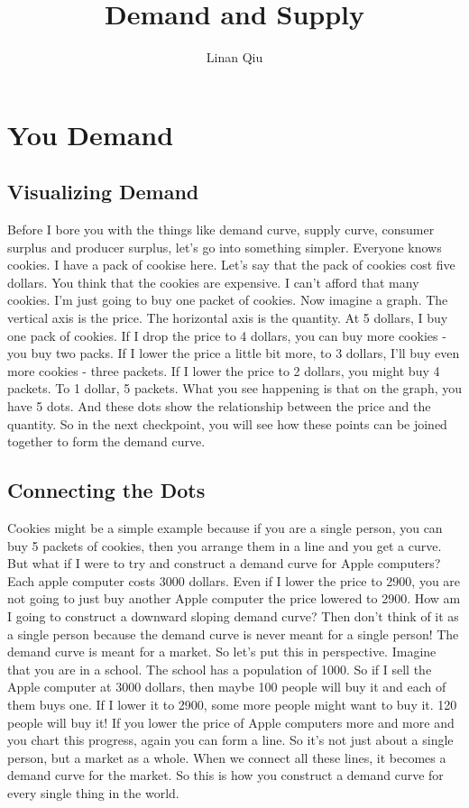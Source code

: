 \documentclass[DIV=classic,11pt,numbers=noenddot,listof=totoc,bibliography=totoc,parskip]{scrartcl}
\title{Demand and Supply}
\author{Linan Qiu}
\date{}
\begin{document}
\maketitle
\tableofcontents
\newpage
\section{You Demand}
\subsection{Visualizing Demand}
Before I bore you with the things like demand curve, supply curve, consumer surplus and producer surplus, let's go into something simpler. Everyone knows cookies. I have a pack of cookise here. Let's say that the pack of cookies cost five dollars. You think that the cookies are expensive. I can't afford that many cookies. I'm just going to buy one packet of cookies. Now imagine a graph. The vertical axis is the price. The horizontal axis is the quantity. At 5 dollars, I buy one pack of cookies. If I drop the price to 4 dollars, you can buy more cookies - you buy two packs. If I lower the price a little bit more, to 3 dollars, I'll buy even more cookies - three packets. If I lower the price to 2 dollars, you might buy 4 packets. To 1 dollar, 5 packets. What you see happening is that on the graph, you have 5 dots. And these dots show the relationship between the price and the quantity. So in the next checkpoint, you will see how these points can be joined together to form the demand curve.
\subsection{Connecting the Dots}
Cookies might be a simple example because if you are a single person, you can buy 5 packets of cookies, then you arrange them in a line and you get a curve. But what if I were to try and construct a demand curve for Apple computers? Each apple computer costs 3000 dollars. Even if I lower the price to 2900, you are not going to just buy another Apple computer the price lowered to 2900. How am I going to construct a downward sloping demand curve? Then don't think of it as a single person because the demand curve is never meant for a single person! The demand curve is meant for a market. So let's put this in perspective. Imagine that you are in a school. The school has a population of 1000. So if I sell the Apple computer at 3000 dollars, then maybe 100 people will buy it and each of them buys one. If I lower it to 2900, some more people might want to buy it. 120 people will buy it! If you lower the price of Apple computers more and more and you chart this progress, again you can form a line. So it's not just about a single person, but a market as a whole. When we connect all these lines, it becomes a demand curve for the market. So this is how you construct a demand curve for every single thing in the world.
\end{document}
